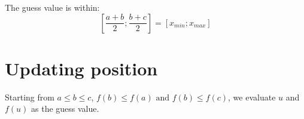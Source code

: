 \documentclass[aps,12pt]{revtex4}
\begin{document}
The guess value is within:
$$
	\left[ \dfrac{a+b}{2}; \dfrac{b+c}{2}\right] = \left[ x_{min} ; x_{max} \right]
$$

\section{Updating position}

Starting from $a\leq b \leq c$, $f(b)\leq f(a) \text{ and } f(b)\leq f(c)$,
we evaluate $u$ and $f(u)$ as the guess value.
\end{document}
